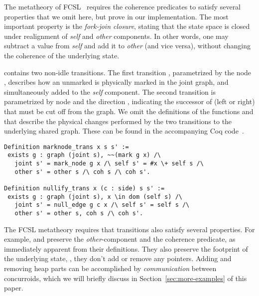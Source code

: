 The metatheory of FCSL~\cite[\S4]{Nanevski-al:ESOP14} requires the
coherence predicates to satisfy several properties that we omit
here, but prove in our implementation. The most important property is
the \emph{fork-join closure}, stating that the state space is closed
under realignment of \emph{self} and \emph{other} components. In other
words, one may subtract a value from \emph{self} and add it to
\emph{other} (and vice versa), without changing the coherence of the
underlying state.


%
 contains two non-idle transitions. The first
transition , parametrized by the node ,
describes how an unmarked  is physically marked in the joint
graph, and simultaneously added to the \emph{self} component.  The
second transition  is parametrized by node
 and the direction , indicating the successor of
 (left or right) that must be cut off from the graph. We omit
the definitions of the functions  and 
that describe the physical changes performed by the two transitions to
the underlying shared graph. These can be found in the accompanying
Coq code~\cite{Sergey-al:PLDI15TR}.
%
%
\begin{lstlisting}
Definition marknode_trans x s s' := 
 exists g : graph (joint s), ~~(mark g x) /\ 
   joint s' = mark_node g x /\ self s' = #x \+ self s /\ 
   other s' = other s /\ coh s /\ coh s'.  

Definition nullify_trans x (c : side) s s' := 
 exists g : graph (joint s), x \in dom (self s) /\ 
   joint s' = null_edge g c x /\ self s' = self s /\ 
   other s' = other s, coh s /\ coh s'.  
\end{lstlisting} 
%
The FCSL metatheory requires that transitions also satisfy several
properties. For example,  and
 preserve the \emph{other}-component and the
coherence predicate, as immediately apparent from their
definitions. They also preserve the footprint of the underlying state,
\ie, they don't add or remove any pointers. Adding and removing heap
parts can be accomplished by \emph{communication} between concurroids,
which we will briefly discuss in Section~\ref{sec:more-examples} of
this paper.

